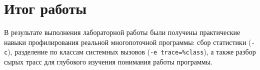\documentclass[12pt,a4paper]{article}
\begin{document}
\section{Итог работы}
В результате выполнения лабораторной работы были получены практические
навыки профилирования реальной многопоточной программы: сбор статистики (\texttt{-c}),
разделение по классам системных вызовов (\texttt{-e trace=\%class}),
а также разбор сырых трасс для глубокого изучения
понимания работы программы.
\end{document}
